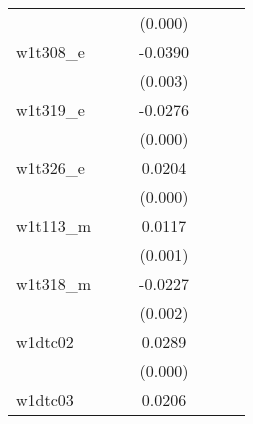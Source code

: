 {\begin{tabular}{l*{6}{c}}
            &                     &                     &     (0.000)         &                     &                     &                     \\
[1em]
w1t308\_e    &                     &                     &     -0.0390\sym{***}&                     &                     &                     \\
            &                     &                     &     (0.003)         &                     &                     &                     \\
[1em]
w1t319\_e    &                     &                     &     -0.0276\sym{***}&                     &                     &                     \\
            &                     &                     &     (0.000)         &                     &                     &                     \\
[1em]
w1t326\_e    &                     &                     &      0.0204\sym{***}&                     &                     &                     \\
            &                     &                     &     (0.000)         &                     &                     &                     \\
[1em]
w1t113\_m    &                     &                     &      0.0117\sym{***}&                     &                     &                     \\
            &                     &                     &     (0.001)         &                     &                     &                     \\
[1em]
w1t318\_m    &                     &                     &     -0.0227\sym{***}&                     &                     &                     \\
            &                     &                     &     (0.002)         &                     &                     &                     \\
[1em]
w1dtc02     &                     &                     &      0.0289\sym{***}&                     &                     &                     \\
            &                     &                     &     (0.000)         &                     &                     &                     \\
[1em]
w1dtc03     &                     &                     &      0.0206\sym{***}&                     &                     &                     \\

\end{tabular}}
